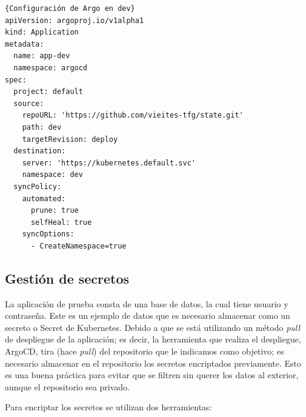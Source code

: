 \begin{lstlisting}[language=helm,label=lst:conf-argo]{Configuración de Argo en dev}
apiVersion: argoproj.io/v1alpha1
kind: Application
metadata:
  name: app-dev
  namespace: argocd
spec:
  project: default
  source:
    repoURL: 'https://github.com/vieites-tfg/state.git'
    path: dev
    targetRevision: deploy
  destination:
    server: 'https://kubernetes.default.svc'
    namespace: dev
  syncPolicy:
    automated:
      prune: true
      selfHeal: true
    syncOptions:
      - CreateNamespace=true
\end{lstlisting}

\subsection*{Gestión de secretos}
\label{subsec:secretos}

La aplicación de prueba consta de una base de datos, la cual tiene usuario y contraseña. Este es un ejemplo de datos que es necesario almacenar como un secreto o Secret de Kubernetes. Debido a que se está utilizando un método \textit{pull}\cite{pull} de despliegue de la aplicación; es decir, la herramienta que realiza el despliegue, ArgoCD, tira (hace \textit{pull}) del repositorio que le indicamos como objetivo; es necesario almacenar en el repositorio los secretos encriptados previamente. Esto es una buena práctica para evitar que se filtren sin querer los datos al exterior, aunque el repositorio sea privado.

Para encriptar los secretos se utilizan dos herramientas:

